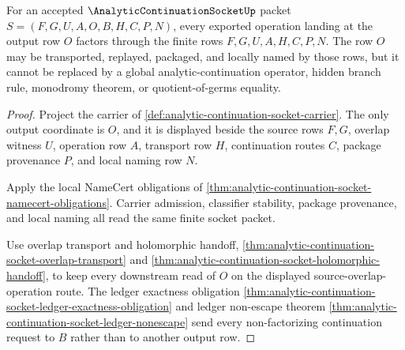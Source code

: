 \begin{theorem}
\label{thm:analytic-continuation-socket-operation-landing-exactness}
For an accepted $\AnalyticContinuationSocketUp$ packet $S=(F,G,U,A,O,B,H,C,P,N)$, every exported operation landing at the output row $O$ factors through the finite rows $F,G,U,A,H,C,P,N$. The row $O$ may be transported, replayed, packaged, and locally named by those rows, but it cannot be replaced by a global analytic-continuation operator, hidden branch rule, monodromy theorem, or quotient-of-germs equality.
\end{theorem}
\begin{proof}
Project the carrier of \autoref{def:analytic-continuation-socket-carrier}. The only output coordinate is $O$, and it is displayed beside the source rows $F,G$, overlap witness $U$, operation row $A$, transport row $H$, continuation routes $C$, package provenance $P$, and local naming row $N$.

Apply the local NameCert obligations of \autoref{thm:analytic-continuation-socket-namecert-obligations}. Carrier admission, classifier stability, package provenance, and local naming all read the same finite socket packet.

Use overlap transport and holomorphic handoff, \autoref{thm:analytic-continuation-socket-overlap-transport} and \autoref{thm:analytic-continuation-socket-holomorphic-handoff}, to keep every downstream read of $O$ on the displayed source-overlap-operation route. The ledger exactness obligation \autoref{thm:analytic-continuation-socket-ledger-exactness-obligation} and ledger non-escape theorem \autoref{thm:analytic-continuation-socket-ledger-nonescape} send every non-factorizing continuation request to $B$ rather than to another output row.
\end{proof}

